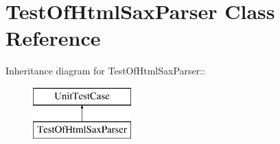 \hypertarget{class_test_of_html_sax_parser}{
\section{TestOfHtmlSaxParser Class Reference}
\label{class_test_of_html_sax_parser}
}
Inheritance diagram for TestOfHtmlSaxParser::\begin{figure}[H]
\begin{center}
\leavevmode
\includegraphics[height=2cm]{class_test_of_html_sax_parser}
\end{center}
\end{figure}
